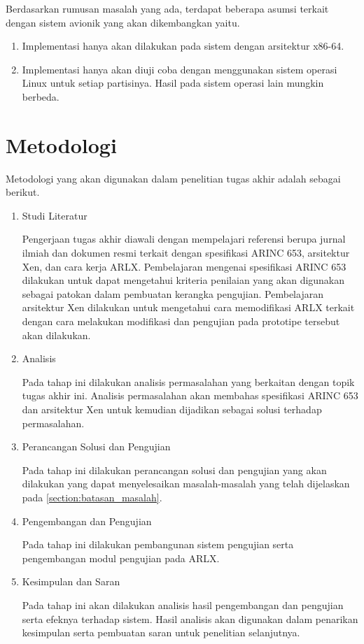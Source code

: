 Berdasarkan rumusan masalah yang ada, terdapat beberapa asumsi terkait dengan sistem avionik
yang akan dikembangkan yaitu.

\begin{enumerate}

    \item Implementasi hanya akan dilakukan pada sistem dengan arsitektur x86-64.

    \item Implementasi hanya akan diuji coba dengan menggunakan sistem operasi Linux untuk
	    setiap partisinya. Hasil pada sistem operasi lain mungkin berbeda.

\end{enumerate}

\section{Metodologi}

Metodologi yang akan digunakan dalam penelitian tugas akhir adalah sebagai berikut.

\begin{enumerate}

    \item Studi Literatur

	Pengerjaan tugas akhir diawali dengan mempelajari referensi berupa jurnal ilmiah dan
	dokumen resmi terkait dengan spesifikasi ARINC 653, arsitektur Xen, dan cara kerja ARLX.
	Pembelajaran mengenai spesifikasi ARINC 653 dilakukan untuk dapat mengetahui kriteria
	penilaian yang akan digunakan sebagai patokan dalam pembuatan kerangka pengujian.
	Pembelajaran arsitektur Xen dilakukan untuk mengetahui cara memodifikasi ARLX terkait
	dengan cara melakukan modifikasi dan pengujian pada prototipe tersebut akan dilakukan.

    \item Analisis

	Pada tahap ini dilakukan analisis permasalahan yang berkaitan dengan topik tugas akhir
	ini. Analisis permasalahan akan membahas spesifikasi ARINC 653 dan arsitektur Xen untuk
	kemudian dijadikan sebagai solusi terhadap permasalahan.

    \item Perancangan Solusi dan Pengujian

	Pada tahap ini dilakukan perancangan solusi dan pengujian yang akan dilakukan yang dapat
	menyelesaikan masalah\hyp{}masalah yang telah dijelaskan pada
	\autoref{section:batasan_masalah}.

    \item Pengembangan dan Pengujian

	Pada tahap ini dilakukan pembangunan sistem pengujian serta pengembangan modul
	pengujian pada ARLX.

    \item Kesimpulan dan Saran

	Pada tahap ini akan dilakukan analisis hasil pengembangan dan pengujian serta efeknya
	terhadap sistem. Hasil analisis akan digunakan dalam penarikan kesimpulan serta
	pembuatan saran untuk penelitian selanjutnya.

\end{enumerate}

